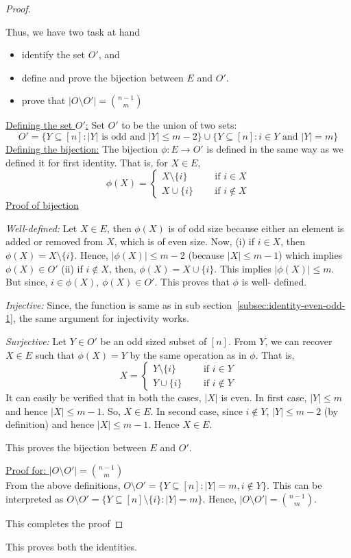 \begin{proof}
\begin{description}
Thus, we have two task at hand
\begin{itemize}
    \item identify the set $O'$, and
    \item define and prove the bijection between $E$ and $O'$.
    \item prove that $|O\setminus O'| = {n-1\choose m}$
\end{itemize}
\underline{Defining the set $O'$:} Set $O'$ to be the union of two sets: 
$$O' = \{Y\subseteq [n]: |Y| \text{ is odd and } |Y|\le m-2\}\cup\{Y\subseteq [n]: i\in Y \text{ and } |Y| = m\}$$
\underline{Defining the bijection:} The bijection $\phi:E\rightarrow O'$ is defined in the same way as we defined it for first identity. That is, for $X\in E$,
\[
\phi(X) = 
\begin{cases}
X\setminus \{i\} & ~~~~~\text{ if } i\in X\\
X\cup\{i\} & ~~~~~\text{ if } i\not\in X
\end{cases}
\]
\underline{Proof of bijection}
\begin{description}
\item \textit{Well-defined:} Let $X\in E$, then $\phi(X)$ is of odd size because either an element is added or removed from $X$, which is of even size. Now, (i) if $i\in X$, then $\phi(X) = X\setminus\{i\}$. Hence, $|\phi(X)|\le m-2$ (because $|X|\le m-1$) which implies $\phi(X)\in O'$ (ii) if $i\not\in X$, then, $\phi(X) = X\cup \{i\}$. This implies $|\phi(X)| \le m$. But since, $i\in \phi(X)$, $\phi(X)\in O'$. This proves that $\phi$ is well- defined.
\item \textit{Injective:} Since, the function is same as in sub section~\ref{subsec:identity-even-odd-1}, the same argument for injectivity works.
\item \textit{Surjective:} Let $Y\in O'$ be an odd sized subset of $[n]$. From $Y$, we can recover $X\in E$ such that $\phi(X) = Y$ by the same operation as in $\phi$. That is, 
 \[
 X= 
 \begin{cases}
Y\setminus \{i\} & ~~~~~\text{ if } i\in Y\\
Y\cup\{i\} & ~~~~~\text{ if } i\not\in Y
 \end{cases}
 \]
 It can easily be verified that in both the cases, $|X|$ is even. 
 In first case, $|Y|\le m$ and hence $|X|\le m-1$. So, $X\in E$. In second case, since $i\not\in Y$, $|Y|\le m-2$ (by definition) and hence $|X|\le m-1$. Hence $X\in E$.
\end{description}
This proves the bijection between $E$ and $O'$. 

\underline{Proof for: $|O\setminus O'| = {n-1\choose m}$}\\
From the above definitions, $O\setminus O' = \{Y\subseteq [n]: |Y| = m, i\not\in Y\}$. This can be interpreted as $O\setminus O' = \{Y\subseteq [n]\setminus \{i\}: |Y| = m\}$. Hence, $|O\setminus O'| = {n-1\choose m}$.
\end{description}
This completes the proof
\end{proof}
This proves both the identities.
